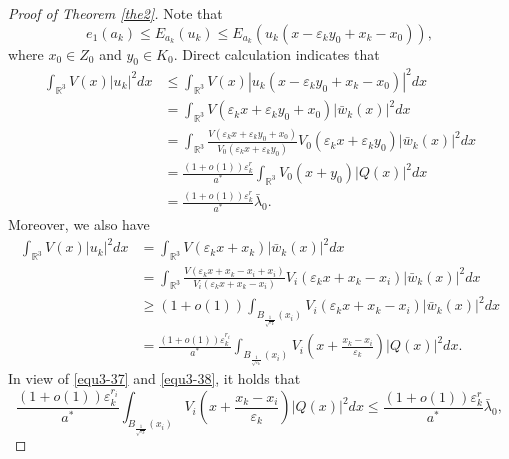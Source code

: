 \documentclass[reqno, 11pt]{amsart} %
\numberwithin{equation}{section}
\begin{document}
	\begin{proof}[Proof of Theorem \ref{the2}] Note that
		\begin{equation*}
			e_{1}(a_{k})\leq E_{a_{k}}(u_{k})\leq E_{a_{k}}(u_{k}(x-\varepsilon_{k}y_{0}+x_{k}-x_{0})),
		\end{equation*}
		where $x_{0}\in Z_{0}$ and $y_{0}\in K_{0}$. Direct calculation indicates that
		\begin{equation}\label{equ3-37}
			\begin{split}
				\int_{\mathbb{R}^{3}}V(x)|u_{k}|^{2}dx&\leq\int_{\mathbb{R}^{3}}V(x)|u_{k}(x-\varepsilon_{k}y_{0}+x_{k}-x_{0})|^{2}dx\\
				&=\int_{\mathbb{R}^{3}}V(\varepsilon_{k}x+\varepsilon_{k}y_{0}+x_{0})|\bar{w}_{k}(x)|^{2}dx\\
				&=\int_{\mathbb{R}^{3}}\frac{V(\varepsilon_{k}x+\varepsilon_{k}y_{0}+x_{0})}{V_{0}(\varepsilon_{k}x+\varepsilon_{k}y_{0})}V_{0}(\varepsilon_{k}x+\varepsilon_{k}y_{0})|\bar{w}_{k}(x)|^{2}dx\\
				&=\frac{(1+o(1))\varepsilon_{k}^{r}}{a^{\ast}}\int_{\mathbb{R}^{3}}V_{0}(x+y_{0})|Q(x)|^{2}dx\\&=\frac{(1+o(1))\varepsilon_{k}^{r}}{a^{\ast}}\bar{\lambda}_{0}.
			\end{split}
		\end{equation}
		Moreover, we also have
		\begin{equation}\label{equ3-38}
			\begin{split}
				\int_{\mathbb{R}^{3}}V(x)|u_{k}|^{2}dx&=	\int_{\mathbb{R}^{3}}V(\varepsilon_{k}x+x_{k})|\bar{w}_{k}(x)|^{2}dx\\
				&=\int_{\mathbb{R}^{3}}\frac{V(\varepsilon_{k}x+x_{k}-x_{i}+x_{i})}{V_{i}(\varepsilon_{k}x+x_{k}-x_{i})}V_{i}(\varepsilon_{k}x+x_{k}-x_{i})|\bar{w}_{k}(x)|^{2}dx\\
				&\geq(1+o(1))\int_{B_{\frac{1}{\sqrt{\varepsilon_{k}}}}(x_{i})}V_{i}(\varepsilon_{k}x+x_{k}-x_{i})|\bar{w}_{k}(x)|^{2}dx\\
				&=\frac{(1+o(1))\varepsilon_{k}^{r_{i}}}{a^{\ast}}\int_{B_{\frac{1}{\sqrt{\varepsilon_{k}}}}(x_{i})}V_{i}\left( x+\frac{x_{k}-x_{i}}{\varepsilon_{k}}\right) |Q(x)|^{2}dx.
			\end{split}
		\end{equation}
		In view of \eqref{equ3-37} and \eqref{equ3-38}, it holds that
		\begin{equation*}
			\frac{(1+o(1))\varepsilon_{k}^{r_{i}}}{a^{\ast}}\int_{B_{\frac{1}{\sqrt{\varepsilon_{k}}}}(x_{i})}V_{i}\left( x+\frac{x_{k}-x_{i}}{\varepsilon_{k}}\right) |Q(x)|^{2}dx\leq \frac{(1+o(1))\varepsilon_{k}^{r}}{a^{\ast}}\bar{\lambda}_{0},

\end{equation*}
\end{proof}
\end{document}
